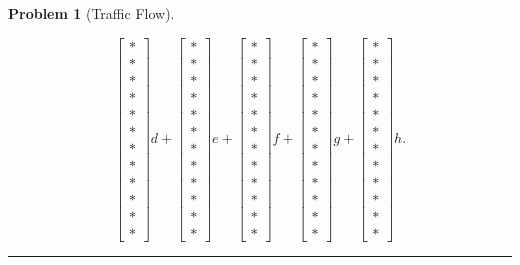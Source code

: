 \documentclass[letterpaper,oneside]{book}%
\theoremstyle{plain}
\theoremstyle{box}
\theoremstyle{problem}
\newtheorem{problemnum}{Problem}[chapter]
\newenvironment{problem}[1][]{\begin{problemnum}[#1]}{\end{problemnum}\nopagebreak\hrule\bigskip}
\newcommand{\bvec}[1]{\begin{bmatrix} #1 \end{bmatrix}}
\begin{document}
\begin{problem}[Traffic Flow]
\begin{enumerate}
$$\bvec{*\\ *\\ *\\ *\\ *\\ *\\ *\\ *\\ *\\ *\\ *\\ *}d+
\bvec{*\\ *\\ *\\ *\\ *\\ *\\ *\\ *\\ *\\ *\\ *\\ *}e+
\bvec{*\\ *\\ *\\ *\\ *\\ *\\ *\\ *\\ *\\ *\\ *\\ *}f+
\bvec{*\\ *\\ *\\ *\\ *\\ *\\ *\\ *\\ *\\ *\\ *\\ *}g+
\bvec{*\\ *\\ *\\ *\\ *\\ *\\ *\\ *\\ *\\ *\\ *\\ *}h.
$$ 

\end{enumerate}
\end{problem}
\end{document}

